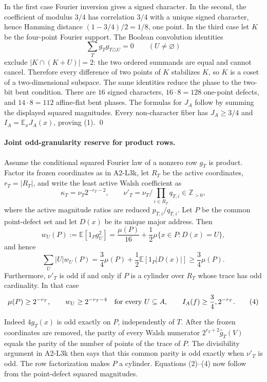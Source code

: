 In the first case Fourier inversion gives a signed character.  In the
second, the coefficient of modulus $3/4$ has correlation $3/4$ with a
unique signed character, hence Hamming distance $(1-3/4)/2=1/8$, one
point.  In the third case let $K$ be the four-point Fourier support.
The Boolean convolution identities
\[
 \sum_T g_Tg_{T\triangle U}=0\qquad(U\ne\varnothing)
\]
exclude $|K\cap(K+U)|=2$: the two ordered summands are equal and cannot
cancel.  Therefore every difference of two points of $K$ stabilizes
$K$, so $K$ is a coset of a two-dimensional subspace.  The same
identities reduce the phase to the two-bit bent condition.  There are
$16$ signed characters, $16\cdot8=128$ one-point defects, and
$14\cdot8=112$ affine-flat bent phases.  The formulas for $J_A$ follow
by summing the displayed squared magnitudes.  Every non-character
fiber has $J_A\ge3/4$ and $I_A=\mathbb E_xJ_A(x)$, proving (1). \qed

\paragraph{Joint odd-granularity reserve for product rows.}
Assume the conditional squared Fourier law of a nonzero row $g_T$ is
product.  Factor its frozen coordinates as in A2-L3k, let $R_T$ be the
active coordinates, $r_T=|R_T|$, and write the least active Walsh
coefficient as
\[
 \kappa_T=\nu_T2^{-r_T-2},\qquad
 \nu'_T=\nu_T\Big/\prod_{i\in R_T}q_{T,i}\in\mathbb Z_{>0},
\]
where the active magnitude ratios are reduced $p_{T,i}/q_{T,i}$.
Let $P$ be the common point-defect set and let $D(x)$ be its unique
major address.  Then
\[
 w_U(P):=\mathbb E[1_Pg_U^2]
   =\frac{\mu(P)}{16}+\frac12\mu\{x\in P:D(x)=U\},
\tag{2}
\]
and hence
\[
 \sum_U|U|w_U(P)=\frac34\mu(P)
   +\frac12\mathbb E[1_P|D(x)|]\ge\frac34\mu(P).
\tag{3}
\]
Furthermore, $\nu'_T$ is odd if and only if $P$ is a cylinder over
$R_T$ whose trace has odd cardinality.  In that case
\[
 \mu(P)\ge2^{-r_T},\qquad
 w_U\ge2^{-r_T-4}\quad\hbox{for every }U\subseteq A,
\qquad I_A(f)\ge\frac34,2^{-r_T}.
\tag{4}
\]

Indeed $4g_T(x)$ is odd exactly on $P$, independently of $T$.  After
the frozen coordinates are removed, the parity of every Walsh
numerator $2^{r_T+2}\widehat g_T(V)$ equals the parity of the number of
points of the trace of $P$.  The divisibility argument in A2-L3k then
says that this common parity is odd exactly when $\nu'_T$ is odd.
The row factorization makes $P$ a cylinder.  Equations (2)--(4) now
follow from the point-defect squared magnitudes.

